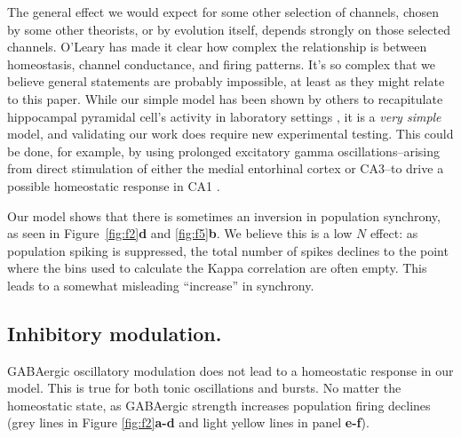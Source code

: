 \documentclass{article}
\begin{document}
The general effect we would expect for some other selection of channels, chosen by some other theorists, or by evolution itself, depends strongly on those selected channels. O'Leary \cite{OLeary2014} has made it clear how complex the relationship is between homeostasis, channel conductance, and firing patterns. It's so complex that we believe general statements are probably impossible, at least as they might relate to this paper. While our simple model has been shown by others to recapitulate hippocampal pyramidal cell's activity in laboratory settings \cite{LeMasson1993}, it is a \textit{very simple} model, and validating our work does require new experimental testing. This could be done, for example, by using prolonged excitatory gamma oscillations--arising from direct stimulation of either the medial entorhinal cortex or CA3--to drive a possible homeostatic response in CA1 \cite{Csicsvari2003,Colgin2009}. 

Our model shows that there is sometimes an inversion in population synchrony, as seen in Figure~\ref{fig:f2}\textbf{d} and \ref{fig:f5}\textbf{b}. We believe this is a low $N$ effect: as population spiking is suppressed, the total number of spikes declines to the point where the bins used to calculate the Kappa correlation are often empty. This leads to a somewhat misleading ``increase'' in synchrony.

\subsection*{Inhibitory modulation.}
GABAergic oscillatory modulation does not lead to a homeostatic response in our model. This is true for both tonic oscillations and bursts. No matter the homeostatic state, as GABAergic strength increases population firing declines (grey lines in Figure \ref{fig:f2}\textbf{a-d} and light yellow lines in panel \textbf{e-f}).
\end{document}
